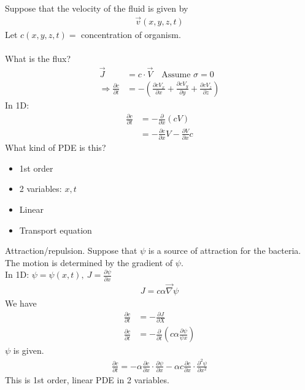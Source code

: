 \documentclass[12pt, letterpaper]{article}
\begin{document}
Suppose that the velocity of the fluid is given by 
\begin{align*}
    \vec{v}(x,y,z,t)
\end{align*}
Let $c(x,y,z,t) = $ concentration of organism. \\ \\
What is the flux? 
\begin{align*}
    \vec{J} &= c\cdot \vec{V} \quad \text{Assume } \sigma = 0 \\
    \Rightarrow \frac{\partial c}{\partial t} &= - \left(\frac{\partial cV_x}{\partial x} + \frac{\partial cV_y}{\partial y} + \frac{\partial cV_z}{\partial z}\right) 
\end{align*}
In 1D: 
\begin{align*}
    \frac{\partial c}{\partial t} &= - \frac{\partial}{\partial x} (cV) \\
    &= - \frac{\partial c}{\partial x} V - \frac{\partial V}{\partial x} c
\end{align*}
What kind of PDE is this?
\begin{itemize}
    \item 1st order
    \item 2 variables: $x,t$
    \item Linear
    \item Transport equation
\end{itemize}
 Attraction/repulsion. Suppose that $\psi$ is a source of attraction for the
bacteria. The motion is determined by the gradient of $\psi$. \\
In 1D: $\psi = \psi(x,t),\ J = \frac{\partial \psi}{\partial x}$ 
\begin{align*}
    J = c\alpha\vec{\nabla}\psi
\end{align*}
We have 
\begin{align*}
    \frac{\partial c}{\partial t} &= - \frac{\partial J}{\partial X} \\
    \frac{\partial c}{\partial t} &= - \frac{\partial}{\partial t} \left(c\alpha \frac{\partial \psi}{\psi x}\right)
\end{align*}
$\psi$ is given.
\begin{align*}
    \frac{\partial c}{\partial t} = - \alpha \frac{\partial c}{\partial x}\cdot \frac{\partial \psi}{\partial x} - \alpha c \frac{\partial c}{\partial x} \cdot \frac{\partial^2 \psi}{\partial x^2}
\end{align*}
This is 1st order, linear PDE in 2 variables. \\ \\
\end{document}
